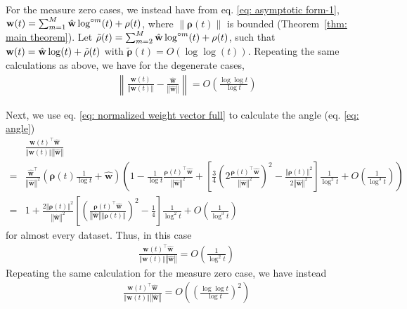 \documentclass[twoside,11pt,english]{article}
\newcommand{\norm}[1]{\left\lVert{#1}\right\rVert}
\begin{document}
For the measure zero cases, we  instead have from eq. \ref{eq: asymptotic form-1}, $\mathbf{w}(t)=\sum_{m=1}^M \hat{\mathbf{w}}\log^{\circ m}(t)+\mathbf{\rho}(t)$, where $\|\mathbf{\rho}(t)\|$ is bounded (Theorem~\ref{thm: main theorem}). Let $\tilde{\mathbf{\rho}}(t)=\sum_{m=2}^M \hat{\mathbf{w}}\log^{\circ m}(t)+\mathbf{\rho}(t)$, such that $\mathbf{w}(t)=\hat{\mathbf{w}}\log(t)+\tilde{\mathbf{\rho}}(t)$ with $\tilde{\mathbf{\rho}}(t)=O(\log\log(t))$. Repeating the same calculations as above, we have for the degenerate cases, 
\begin{align}
 & \norm{\frac{\mathbf{w}\left(t\right)}{\left\Vert \mathbf{w}\left(t\right)\right\Vert } - \frac{\hat{\mathbf{w}}}{\left\Vert \hat{\mathbf{w}}\right\Vert }} = O\left(\frac{\log \log t}{\log t}\right)\nonumber
\end{align} 



Next, we use eq. \ref{eq: normalized weight vector full} to calculate the
angle (eq. \ref{eq: angle})
\begin{align*}
 & \frac{\mathbf{w}\left(t\right)^{\top}\hat{\mathbf{w}}}{\left\Vert \mathbf{w}\left(t\right)\right\Vert \left\Vert \hat{\mathbf{w}}\right\Vert }\\
= & \frac{\hat{\mathbf{w}}^{\top}}{\left\Vert \hat{\mathbf{w}}\right\Vert ^{2}}\left(\boldsymbol{\rho}\left(t\right)\frac{1}{\log t}+\hat{\mathbf{w}}\right)\left(1-\frac{1}{\log t}\frac{\boldsymbol{\rho}\left(t\right)^{\top}\hat{\mathbf{w}}}{\left\Vert \hat{\mathbf{w}}\right\Vert ^{2}}+\left[\frac{3}{4}\left(2\frac{\boldsymbol{\rho}\left(t\right)^{\top}\hat{\mathbf{w}}}{\left\Vert \hat{\mathbf{w}}\right\Vert ^{2}}\right)^{2}-\frac{\left\Vert \boldsymbol{\rho}\left(t\right)\right\Vert ^{2}}{2\left\Vert \hat{\mathbf{w}}\right\Vert ^{2}}\right]\frac{1}{\log^{2}t}+O\left(\frac{1}{\log^{3}t}\right)\right)\\
= & 1+\frac{2\left\Vert \boldsymbol{\rho}\left(t\right)\right\Vert ^{2}}{\left\Vert \hat{\mathbf{w}}\right\Vert ^{2}}\left[\left(\frac{\boldsymbol{\rho}\left(t\right)^{\top}\hat{\mathbf{w}}}{\left\Vert \hat{\mathbf{w}}\right\Vert \left\Vert \boldsymbol{\rho}\left(t\right)\right\Vert }\right)^{2}-\frac{1}{4}\right]\frac{1}{\log^{2}t}+O\left(\frac{1}{\log^{3}t}\right)
\end{align*}
for almost every dataset. Thus, in this case
\begin{align}
 & \frac{\mathbf{w}\left(t\right)^{\top}\hat{\mathbf{w}}}{\left\Vert \mathbf{w}\left(t\right)\right\Vert \left\Vert \hat{\mathbf{w}}\right\Vert } = O\left(\frac{1}{\log^2 t}\right)\nonumber
\end{align} 
Repeating the same calculation for the measure zero case, we have instead
\begin{align}
 & \frac{\mathbf{w}\left(t\right)^{\top}\hat{\mathbf{w}}}{\left\Vert \mathbf{w}\left(t\right)\right\Vert \left\Vert \hat{\mathbf{w}}\right\Vert } = O\left(\left(\frac{\log \log t}{\log t}\right)^2\right)\nonumber
\end{align} 
\end{document}

